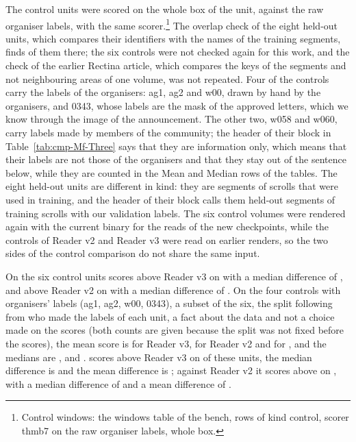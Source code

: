 The control units were scored on the whole box of the unit, against the raw organiser labels, with the same
scorer.\footnote{Control windows: the windows table of the bench, rows of kind control, scorer
thmb7 on the raw organiser labels, whole box.} The overlap check of the eight held-out units, which compares their identifiers with the names of the \TrainSegN{} training segments, finds \OverlapHeld{} of them there; the six controls were not checked again for this work, and the check of the earlier Rectina article, which compares the keys of the segments and not neighbouring areas of one volume, was not repeated. Four of the controls carry the
labels of the organisers: ag1, ag2 and w00, drawn by hand by the organisers, and 0343, whose labels are the mask of the
approved letters, which we know through the image of the announcement. The other two, w058 and w060, carry
labels made by members of the community; the header of their block in Table~\ref{tab:cmp-Mf-Three} says that they are
information only, which means that their labels are not those of the organisers and that they stay out of the
sentence below, while they are counted in the Mean and Median rows of the tables. The eight held-out units are
different in kind: they are segments of scrolls that were used in training, and the header of their block calls them
held-out segments of training scrolls with our validation labels. The six control volumes were rendered again with the current binary for the reads of the new checkpoints, while the controls of Reader v2 and Reader v3 were read on earlier renders, so the two sides of the control comparison do not share the same input.

On the six control units \MfName{} scores above Reader v3 on \MfCtrlKTextThree{} with a median difference of \MfCtrlMedianDiffThreeAuc{}, and above Reader v2 on \MfCtrlKTextTwo{} with a median difference of \MfCtrlMedianDiffTwoAuc{}. On the four controls with organisers' labels (ag1, ag2, w00, 0343), a subset of the six, the split following from who made the labels of each unit, a fact about the data and not a choice made on the scores (both counts are given because the split was not fixed before the scores), the mean score is \MfOrgMeanRThreeAuc{} for Reader v3, \MfOrgMeanRTwoAuc{} for Reader v2 and \MfOrgMeanOwnAuc{} for
\MfName{}, and the medians are \MfOrgMedianRThreeAuc{}, \MfOrgMedianRTwoAuc{} and \MfOrgMedianOwnAuc{}. \MfName{} scores above Reader v3 on
\MfOrgKTextThree{} of these units, the median difference is \MfOrgMedianDiffThreeAuc{} and the mean difference is
\MfOrgMeanDiffThreeAuc{}; against Reader v2 it scores above on \MfOrgKTextTwo{}, with a median difference of \MfOrgMedianDiffTwoAuc{} and a mean difference of \MfOrgMeanDiffTwoAuc{}.


